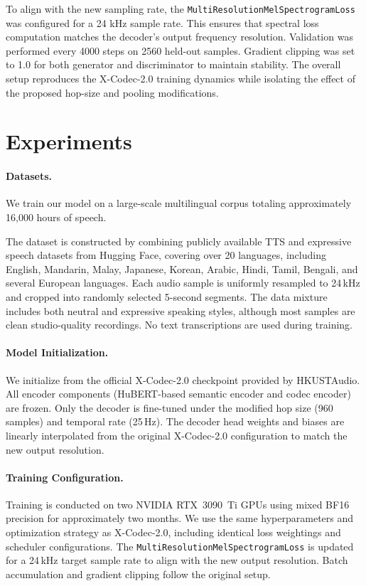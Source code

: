 \documentclass[preprint]{article}
\begin{document}
To align with the new sampling rate, the \texttt{MultiResolutionMelSpectrogramLoss} was configured for a 24 kHz sample rate. This ensures that spectral loss computation matches the decoder's output frequency resolution. Validation was performed every 4000 steps on 2560 held-out samples. Gradient clipping was set to 1.0 for both generator and discriminator to maintain stability. The overall setup reproduces the X-Codec-2.0 training dynamics while isolating the effect of the proposed hop-size and pooling modifications.

\section{Experiments}

\paragraph{Datasets.}

We train our model on a large-scale multilingual corpus totaling approximately 16,000 hours of speech.

The dataset is constructed by combining publicly available TTS and expressive speech datasets from Hugging Face, covering over 20 languages, including English, Mandarin, Malay, Japanese, Korean, Arabic, Hindi, Tamil, Bengali, and several European languages.
Each audio sample is uniformly resampled to 24\,kHz and cropped into randomly selected 5-second segments.
The data mixture includes both neutral and expressive speaking styles, although most samples are clean studio-quality recordings.
No text transcriptions are used during training.

\paragraph{Model Initialization.}
We initialize from the official X-Codec-2.0 checkpoint provided by HKUSTAudio.
All encoder components (HuBERT-based semantic encoder and codec encoder) are frozen.
Only the decoder is fine-tuned under the modified hop size (960 samples) and temporal rate (25\,Hz).
The decoder head weights and biases are linearly interpolated from the original X-Codec-2.0 configuration to match the new output resolution.

\paragraph{Training Configuration.}
Training is conducted on two NVIDIA RTX~3090~Ti GPUs using mixed BF16 precision for approximately two months.
We use the same hyperparameters and optimization strategy as X-Codec-2.0, including identical loss weightings and scheduler configurations.
The \texttt{MultiResolutionMelSpectrogramLoss} is updated for a 24\,kHz target sample rate to align with the new output resolution.
Batch accumulation and gradient clipping follow the original setup.
\end{document}
